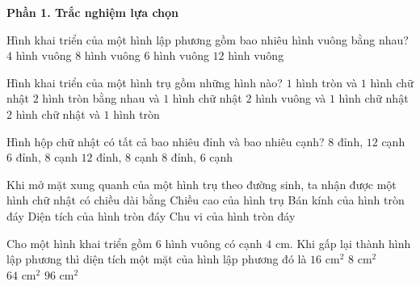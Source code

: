 \textbf{Phần 1. Trắc nghiệm lựa chọn}

\begin{ex} %
Hình khai triển của một hình lập phương gồm bao nhiêu hình vuông bằng nhau?
\choice
{$4$ hình vuông}
{$8$ hình vuông}
{\True $6$ hình vuông}
{$12$ hình vuông}
\end{ex}

\begin{ex} %
Hình khai triển của một hình trụ gồm những hình nào?
\choice
{$1$ hình tròn và $1$ hình chữ nhật}
{\True $2$ hình tròn bằng nhau và $1$ hình chữ nhật}
{$2$ hình vuông và $1$ hình chữ nhật}
{$2$ hình chữ nhật và $1$ hình tròn}
\end{ex}

\begin{ex} %
Hình hộp chữ nhật có tất cả bao nhiêu đỉnh và bao nhiêu cạnh?
\choice
{\True $8$ đỉnh, $12$ cạnh}
{$6$ đỉnh, $8$ cạnh}
{$12$ đỉnh, $8$ cạnh}
{$8$ đỉnh, $6$ cạnh}
\end{ex}

\begin{ex} %
Khi mở mặt xung quanh của một hình trụ theo đường sinh, ta nhận được một hình chữ nhật có chiều dài bằng
\choice
{Chiều cao của hình trụ}
{Bán kính của hình tròn đáy}
{Diện tích của hình tròn đáy}
{\True Chu vi của hình tròn đáy}
\end{ex}

\begin{ex} %
Cho một hình khai triển gồm $6$ hình vuông có cạnh $4\text{ cm}$. Khi gấp lại thành hình lập phương thì diện tích một mặt của hình lập phương đó là
\choice
{\True $16\text{ cm}^2$}
{$8\text{ cm}^2$}
{$64\text{ cm}^2$}
{$96\text{ cm}^2$}
\end{ex}

